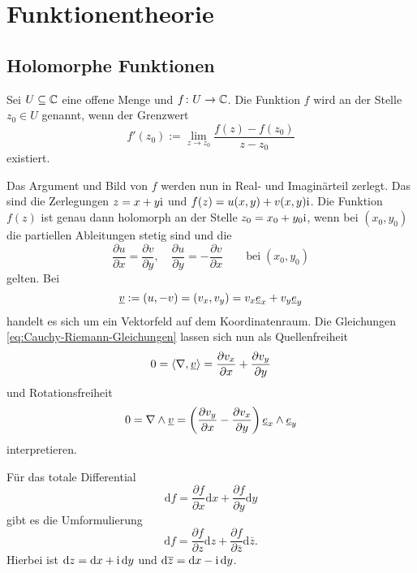 
\chapter{Funktionentheorie}
\section{Holomorphe Funktionen}

\begin{definition}
Sei $U\subseteq\mathbb C$ eine offene Menge und $f\colon U\to\mathbb C$.
Die Funktion $f$ wird  an der
Stelle $z_0\in U$ genannt, wenn der Grenzwert
\begin{equation}
f'(z_0) := \lim_{z\to z_0} \frac{f(z)-f(z_0)}{z-z_0}
\end{equation}
existiert.
\end{definition}

\noindent
Das Argument und Bild von $f$ werden nun in Real- und Imaginärteil
zerlegt. Das sind die Zerlegungen $z=x+y\mathrm i$ und $f(z)=u(x,y)+v(x,y)\mathrm i$.
Die Funktion $f(z)$ ist genau dann holomorph an der Stelle
$z_0=x_0+y_0\mathrm i$, wenn bei $(x_0,y_0)$ die partiellen Ableitungen
stetig sind und die 
\begin{equation}\label{eq:Cauchy-Riemann-Gleichungen}
\frac{\partial u}{\partial x}=\frac{\partial v}{\partial y},
\quad \frac{\partial u}{\partial y}=-\frac{\partial v}{\partial x}
\qquad\text{bei}\;(x_0,y_0)
\end{equation}
gelten. Bei
\begin{equation}
\underline{v} := (u,-v) = (v_x,v_y) = v_x\underline{e}_x+v_y\underline{e}_y
\end{equation}
handelt es sich um ein Vektorfeld
auf dem Koordinatenraum. Die Gleichungen
\eqref{eq:Cauchy-Riemann-Gleichungen} lassen sich nun als
Quellenfreiheit
\begin{equation}
0=\langle\nabla,\underline{v}\rangle = \frac{\partial v_x}{\partial x}+\frac{\partial v_y}{\partial y}
\end{equation}
und Rotationsfreiheit
\begin{equation}
0=\nabla\wedge \underline{v} = \bigg(\frac{\partial v_y}{\partial x}
-\frac{\partial v_x}{\partial y}\bigg)\,\underline{e}_x\wedge\underline{e}_y
\end{equation}
interpretieren.

Für das totale Differential
\begin{equation}
\mathrm df = \frac{\partial f}{\partial x}\mathrm dx+\frac{\partial f}{\partial y}\mathrm dy
\end{equation}
gibt es die Umformulierung
\begin{equation}\label{eq:Differential-Wirtinger-Operatoren}
\mathrm df = \frac{\partial f}{\partial z}\mathrm dz+\frac{\partial f}{\partial\overline z}\mathrm d\overline z.
\end{equation}
Hierbei ist $\mathrm dz=\mathrm dx+\mathrm i\,\mathrm dy$ und $\mathrm d\overline{z}=\mathrm dx-\mathrm i\,\mathrm dy$.

